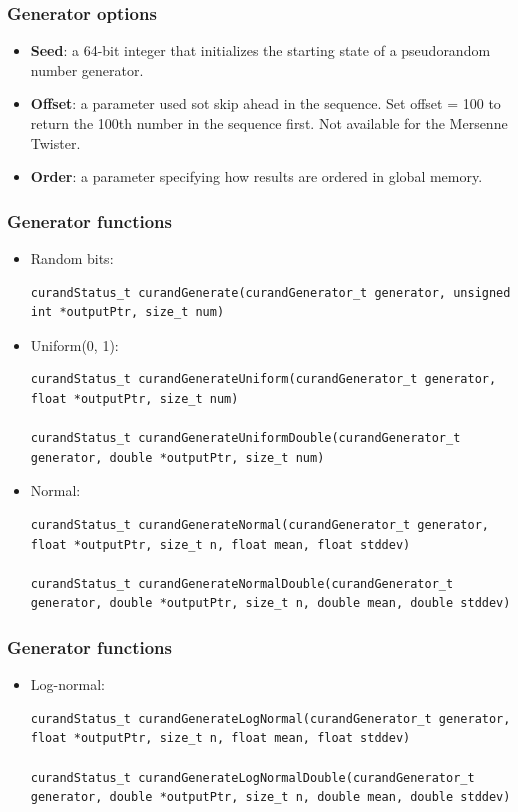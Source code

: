 \documentclass[handout]{beamer}
\numberwithin{equation}{section}
\begin{document}
\begin{frame}
\frametitle{Generator options}
\begin{itemize}
\item {\bf Seed}: a 64-bit integer that initializes the starting state of a pseudorandom number generator.
\pause \item {\bf Offset}: a parameter used sot skip ahead in the sequence. Set offset = 100 to return the 100th number in the sequence first. Not available for the Mersenne Twister.
\pause \item {\bf Order}: a parameter specifying how results are ordered in global memory.
\end{itemize}
\end{frame}

\begin{frame}[fragile]
\frametitle{Generator functions}
\begin{itemize}
\item Random bits:
\lstset{basicstyle=\tiny}
\begin{lstlisting}
curandStatus_t curandGenerate(curandGenerator_t generator, unsigned int *outputPtr, size_t num)
\end{lstlisting}

\pause \item Uniform(0, 1):
\begin{lstlisting}
curandStatus_t curandGenerateUniform(curandGenerator_t generator, float *outputPtr, size_t num)

curandStatus_t curandGenerateUniformDouble(curandGenerator_t generator, double *outputPtr, size_t num)
\end{lstlisting}

\pause \item Normal:
\begin{lstlisting}
curandStatus_t curandGenerateNormal(curandGenerator_t generator, float *outputPtr, size_t n, float mean, float stddev)

curandStatus_t curandGenerateNormalDouble(curandGenerator_t generator, double *outputPtr, size_t n, double mean, double stddev)
\end{lstlisting}
\end{itemize}
\end{frame}


\begin{frame}[fragile]
\frametitle{Generator functions} \lstset{basicstyle=\tiny}
\begin{itemize}

\item Log-normal:
\begin{lstlisting}
curandStatus_t curandGenerateLogNormal(curandGenerator_t generator, float *outputPtr, size_t n, float mean, float stddev)

curandStatus_t curandGenerateLogNormalDouble(curandGenerator_t generator, double *outputPtr, size_t n, double mean, double stddev)
\end{lstlisting}
\end{itemize}
\end{frame}
\end{document}
